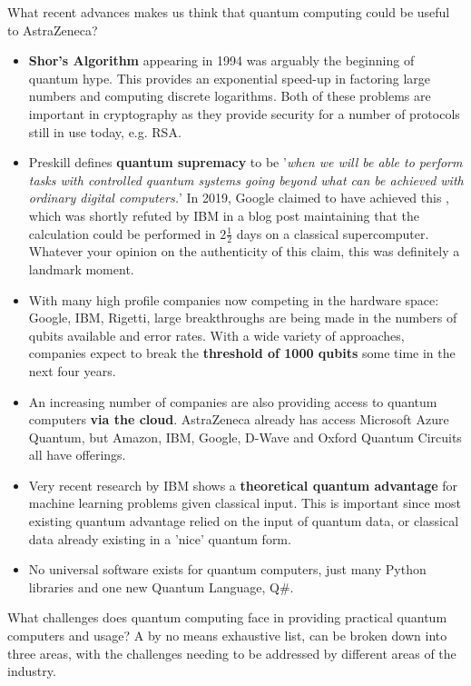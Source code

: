 \documentclass{article}
\theoremstyle{definition}
\begin{document}
What recent advances makes us think that quantum computing could be useful to AstraZeneca? 
\begin{itemize}
    \item \textbf{Shor's Algorithm} \cite{Shor_1997} appearing in 1994 was arguably the beginning of quantum hype. This provides an exponential speed-up in factoring large numbers and computing discrete logarithms. Both of these problems are important in cryptography as they provide security for a number of protocols still in use today, e.g. RSA.
    \item Preskill \cite{preskill2012quantum} defines \textbf{quantum supremacy} to be '\textit{when we will be able to perform tasks with controlled quantum systems going beyond what can be achieved with ordinary digital computers.}' In 2019, Google claimed to have achieved this \cite{quantum_supremacy}, which was shortly refuted by IBM \cite{ibm_refute} in a blog post maintaining that the calculation could be performed in $2 \frac{1}{2}$ days on a classical supercomputer. Whatever your opinion on the authenticity of this claim, this was definitely a landmark moment.
    \item With many high profile companies now competing in the hardware space: Google, IBM, Rigetti, large breakthroughs are being made in the numbers of qubits available and error rates. With a wide variety of approaches, companies expect to break the \textbf{threshold of 1000 qubits} some time in the next four years. 
    \item An increasing number of companies are also providing access to quantum computers \textbf{via the cloud}. AstraZeneca already has access Microsoft Azure Quantum, but Amazon, IBM, Google, D-Wave and Oxford Quantum Circuits all have offerings.
    \item Very recent research by IBM \cite{Liu_2021} shows a \textbf{theoretical quantum advantage} for machine learning problems given classical input. This is important since most existing quantum advantage relied on the input of quantum data, or classical data already existing in a 'nice' quantum form. 
    \item  No universal software exists for quantum computers, just many Python libraries and one new Quantum Language, Q\#. 
\end{itemize}

What challenges does quantum computing face in providing practical quantum computers and usage? A by no means exhaustive list, can be broken down into three areas, with the challenges needing to be addressed by different areas of the industry. 
\end{document}

